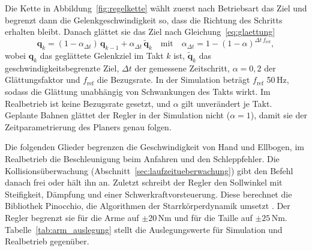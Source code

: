 Die Kette in Abbildung~\ref{fig:regelkette} wählt zuerst nach Betriebsart das Ziel und begrenzt dann die Gelenkgeschwindigkeit so, dass die Richtung des Schritts erhalten bleibt.
Danach glättet sie das Ziel nach Gleichung~\ref{eq:glaettung}
\begin{equation}
  \mathbf{q}_k = (1-\alpha_{\Delta t})\,\mathbf{q}_{k-1} + \alpha_{\Delta t}\,\tilde{\mathbf{q}}_k
  \quad\mathrm{mit}\quad
  \alpha_{\Delta t} = 1-(1-\alpha)^{\Delta t\, f_\mathrm{ref}} ,
  \label{eq:glaettung}
\end{equation}
%
wobei $\mathbf{q}_k$ das geglättete Gelenkziel im Takt $k$ ist, $\tilde{\mathbf{q}}_k$ das geschwindigkeitsbegrenzte Ziel, $\Delta t$ der gemessene Zeitschritt, $\alpha = 0{,}2$ der Glättungsfaktor und $f_\mathrm{ref}$ die Bezugsrate.
In der Simulation beträgt $f_\mathrm{ref}$ 50\,Hz, sodass die Glättung unabhängig von Schwankungen des Takts wirkt. Im Realbetrieb ist keine Bezugsrate gesetzt, und $\alpha$ gilt unverändert je Takt.
Geplante Bahnen glättet der Regler in der Simulation nicht ($\alpha = 1$), damit sie der Zeitparametrierung des Planers genau folgen.

Die folgenden Glieder begrenzen die Geschwindigkeit von Hand und Ellbogen, im Realbetrieb die Beschleunigung beim Anfahren und den Schleppfehler.
Die Kollisionsüberwachung (Abschnitt~\ref{sec:laufzeitueberwachung}) gibt den Befehl danach frei oder hält ihn an.
Zuletzt schreibt der Regler den Sollwinkel mit Steifigkeit, Dämpfung und einer Schwerkraftvorsteuerung. Diese berechnet die Bibliothek Pinocchio, die Algorithmen der Starrkörperdynamik umsetzt \cite{Carpentier2019}. Der Regler begrenzt sie für die Arme auf $\pm 20$\,Nm und für die Taille auf $\pm 25$\,Nm.
Tabelle~\ref{tab:arm_auslegung} stellt die Auslegungswerte für Simulation und Realbetrieb gegenüber.

